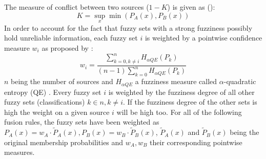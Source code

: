 \documentclass[10pt]{article}
\begin{document}
The measure of conflict between two sources ($1-K$) is given as (\cite{ouerghemmi_two-step_2017,dubois_possibility}):
\begin{equation}
    K=\sup_x\min(P_A(x), P_B(x))
\end{equation}
In order to account for the fact that fuzzy sets with a strong fuzziness possibly hold unreliable information, each fuzzy set $i$ is weighted by a pointwise confidence measure $w_i$ as proposed by \cite{fauvel_decision_fusion}:
\begin{equation}
    w_i=\frac{\sum_{k=0,k\neq i}^{n}H_{\alpha QE}(P_k)}{(n-1)\sum_{k=0}^{n}H_{\alpha QE}(P_k)}
\end{equation}
$n$ being the number of sources and $H_{\alpha QE}$ a fuzziness measure called $\alpha$-quadratic entropy (QE) \parencite{pal_measuring_1994}. Every fuzzy set $i$ is weighted by the fuzziness degree of all other fuzzy sets (classifications) $k\in n,k\neq i$. If the fuzziness degree of the other sets is high the weight on a given source $i$ will be high too. For all of the following fusion rules, the fuzzy sets have been weighted as $P_A(x)=w_A\cdot\tilde{P}_A(x), P_B(x)=w_B\cdot\tilde{P}_B(x)$, $\tilde{P}_A(x)$ and $\tilde{P}_B(x)$ being the original membership probabilities and $w_A, w_B$ their corresponding pointwise measures.\\
\end{document}
